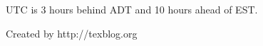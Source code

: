 \documentclass{article}
\begin{document}
UTC  is 3  hours behind
ADT and  10 hours  ahead of
EST.  

\printnomenclature
\small\hfill Created by http://texblog.org
\end{document}
